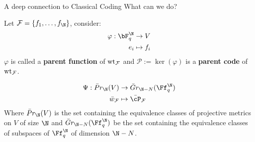 \begin{frame}{A deep connection to Classical Coding }{What can we do?}

Let \(\cF = \{ f_1,\ldots, f_{\N} \}\), consider: \pause
\begin{align}
	\varphi:\bF_q^{\N}&\to  V \\
	 e_i &\mapsto  f_i  
\end{align}
\pause %
$\varphi$ is called a \textbf{parent function} of $\operatorname{wt}_{\mathcal{F}}$ and 
\pause %
$\mathcal{P} := \ker(\varphi)$ is a \textbf{parent code} of $\operatorname{wt}_{\mathcal{F}}$.
\pause
\begin{theorem}
    \begin{align*}
    \Psi: \bar Pr_{\N}(V) &\to \bar Gr_{\N-N}(\Ff_q^{\N}) \\
    \bar w_{\cF} &\mapsto \bar \cP_{\cF}
	\end{align*}
    Where $ \bar Pr_{\N}(V)$ is the set containing the equivalence classes of projective metrics on $V$ of size $\N$ and $\bar Gr_{\N-N}(\Ff_q^{\N})$ be the set containing the equivalence classes of subspaces of $\Ff^{\N}_q$ of dimension $\N - N$.
\end{theorem}


\end{frame}







